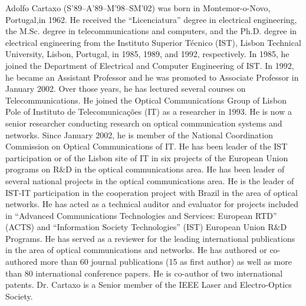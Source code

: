 \documentclass[journal]{IEEEtran}
\begin{document}
\begin{IEEEbiographynophoto}{Adolfo Cartaxo}
(S’89–A’89–M’98–SM’02) was born in Montemor-o-Novo, Portugal,in 1962. He received the “Licenciatura” degree in electrical engineering, the M.Sc. degree in telecommunications and computers, and the Ph.D. degree in electrical engineering from the Instituto Superior Técnico (IST), Lisbon Technical University, Lisbon, Portugal, in 1985, 1989, and 1992, respectively. In 1985, he joined the Department of Electrical and Computer Engineering of IST. In 1992, he became an Assistant Professor and he was promoted to Associate Professor in January 2002. Over those years, he has lectured several courses on Telecommunications. He joined the Optical Communications Group of Lisbon Pole of Instituto de Telecomunicações (IT) as a researcher in 1993. He is now a senior researcher conducting research on optical communication systems and networks. Since January 2002, he is member of the National Coordination Commission on Optical Communications of IT. He has been leader of the IST participation or of the Lisbon site of IT in six projects of the European Union programs on R$\&$D in the optical communications area. He has been leader of several national projects in the optical communications area. He is the leader of IST-IT participation in the cooperation project with Brazil in the area of optical networks. He has acted as a technical auditor and evaluator for projects included in “Advanced Communications Technologies and Services: European RTD” (ACTS) and “Information Society Technologies” (IST) European Union R$\&$D Programs. He has served as a reviewer for the leading international publications in the area of optical communications and networks. He has authored or co-authored more than 60 journal publications (15 as first author) as well as more than 80 international conference papers. He is co-author of two international patents.
Dr. Cartaxo is a Senior member of the IEEE Laser and Electro-Optics Society. 

\end{IEEEbiographynophoto}
\end{document}
